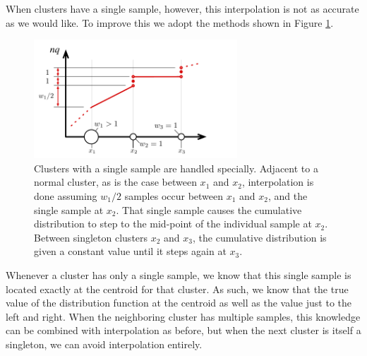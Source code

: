\documentclass[11pt]{amsart}
\begin{document}
When clusters have a single sample, however, this interpolation is not as accurate as we would like. To improve this we adopt the methods shown in Figure \ref{fig:singletons}. 
\begin{figure}[tb] %
   \centering
   \includegraphics[width=3in]{quantile-figures/singleton.pdf} 
   \caption{Clusters with a single sample are handled specially. Adjacent to a normal cluster, as is the case between $x_1$ and $x_2$, interpolation is done assuming $w_1/2$ samples occur between $x_1$ and $x_2$, and the single sample at $x_2$. That single sample causes the cumulative distribution to step to the mid-point of the individual sample at $x_2$. Between singleton clusters $x_2$ and $x_3$, the cumulative distribution is given a constant value until it steps again at $x_3$.}
   \label{fig:singletons}
\end{figure}
Whenever a cluster has only a single sample, we know that this single sample is located exactly at the centroid for that cluster. As such, we know that the true value of the distribution function at the centroid as well as the value just to the left and right. When the neighboring cluster has multiple samples, this knowledge can be combined with interpolation as before, but when the next cluster is itself a singleton, we can avoid interpolation entirely. 
\end{document}
